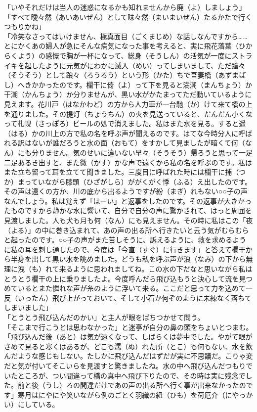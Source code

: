 \documentclass{book}
\begin{document}
「いやそれだけは当人の迷惑になるかも知れませんから廃（よ）しましょう」\\
「すべて曖々然（あいあいぜん）として昧々然（まいまいぜん）たるかたで行くつもりかね」\\
「冷笑なさってはいけません、極真面目（ごくまじめ）な話しなんですから\ldots{}\ldots{}とにかくあの婦人が急にそんな病気になった事を考えると、実に飛花落葉（ひからくよう）の感慨で胸が一杯になって、総身（そうしん）の活気が一度にストライキを起したように元気がにわかに滅入（めい）ってしまいまして、ただ蹌々（そうそう）として踉々（ろうろう）という形（かた）ちで吾妻橋（あずまばし）へきかかったのです。欄干に倚（よ）って下を見ると満潮（まんちょう）か干潮（かんちょう）か分りませんが、黒い水がかたまってただ動いているように見えます。花川戸（はなかわど）の方から人力車が一台馳（か）けて来て橋の上を通りました。その提灯（ちょうちん）の火を見送っていると、だんだん小くなって札幌（さっぽろ）ビールの処で消えました。私はまた水を見る。すると遥（はる）かの川上の方で私の名を呼ぶ声が聞えるのです。はてな今時分人に呼ばれる訳はないが誰だろうと水の面（おもて）をすかして見ましたが暗くて何（なん）にも分りません。気のせいに違いない早々（そうそう）帰ろうと思って一足二足あるき出すと、また微（かす）かな声で遠くから私の名を呼ぶのです。私はまた立ち留って耳を立てて聞きました。三度目に呼ばれた時には欄干に捕（つか）まっていながら膝頭（ひざがしら）ががくがく悸（ふる）え出したのです。その声は遠くの方か、川の底から出るようですが紛（まぎ）れもない○○子の声なんでしょう。私は覚えず「はーい」と返事をしたのです。その返事が大きかったものですから静かな水に響いて、自分で自分の声に驚かされて、はっと周囲を見渡しました。人も犬も月も何（なん）にも見えません。その時に私はこの「夜（よる）」の中に巻き込まれて、あの声の出る所へ行きたいと云う気がむらむらと起ったのです。○○子の声がまた苦しそうに、訴えるように、救を求めるように私の耳を刺し通したので、今度は「今直（すぐ）に行きます」と答えて欄干から半身を出して黒い水を眺めました。どうも私を呼ぶ声が浪（なみ）の下から無理に洩（も）れて来るように思われましてね。この水の下だなと思いながら私はとうとう欄干の上に乗りましたよ。今度呼んだら飛び込もうと決心して流を見つめているとまた憐れな声が糸のように浮いて来る。ここだと思って力を込めて一反（いったん）飛び上がっておいて、そして小石か何ぞのように未練なく落ちてしまいました」\\
「とうとう飛び込んだのかい」と主人が眼をぱちつかせて問う。\\
「そこまで行こうとは思わなかった」と迷亭が自分の鼻の頭をちょいとつまむ。\\
「飛び込んだ後（あと）は気が遠くなって、しばらくは夢中でした。やがて眼がさめて見ると寒くはあるが、どこも濡（ぬ）れた所（とこ）も何もない、水を飲んだような感じもしない。たしかに飛び込んだはずだが実に不思議だ。こりゃ変だと気が付いてそこいらを見渡すと驚きましたね。水の中へ飛び込んだつもりでいたところが、つい間違って橋の真中へ飛び下りたので、その時は実に残念でした。前と後（うし）ろの間違だけであの声の出る所へ行く事が出来なかったのです」寒月はにやにや笑いながら例のごとく羽織の紐（ひも）を荷厄介（にやっかい）にしている。\\
\end{document}
